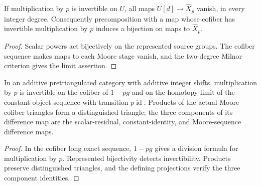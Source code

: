 \begin{proposition}
  \label{prop:moore-completion-orthogonality}
  \leanok
  If multiplication by $p$ is invertible on $U$, all maps
  $U[d]\to\widehat X_p$ vanish, in every integer degree. Consequently
  precomposition with a map whose cofiber has invertible multiplication
  by $p$ induces a bijection on maps to $\widehat X_p$.
\end{proposition}
\begin{proof}
  Scalar powers act bijectively on the represented source groups.
  The cofiber sequence makes maps to each Moore stage vanish, and
  the two-degree Milnor criterion gives the limit assertion.
  \leanok
\end{proof}

\begin{proposition}
  \label{prop:scalar-residual-limit}
  \leanok
  In an additive pretriangulated category with additive integer shifts,
  multiplication by $p$ is invertible on the cofiber of $1-pg$
  and on the homotopy limit of the constant-object sequence with
  transition $p\operatorname{id}$. Products of the actual Moore
  cofiber triangles form a distinguished triangle; the three components
  of its difference map are the scalar-residual, constant-identity,
  and Moore-sequence difference maps.
\end{proposition}
\begin{proof}
  In the cofiber long exact sequence, $1-pg$ gives a division
  formula for multiplication by $p$. Represented bijectivity detects
  invertibility. Products preserve distinguished triangles, and the
  defining projections verify the three component identities.
  \leanok
\end{proof}

